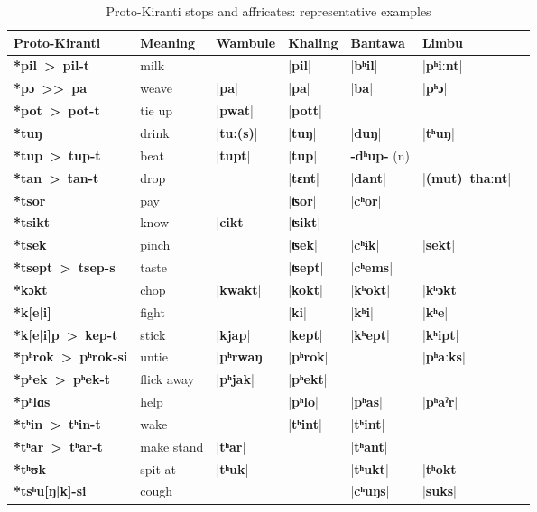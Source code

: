\documentclass[oldfontcommands,oneside,a4paper,11pt]{article}
\newcommand{\ipa}[1]{\textbf{{\phon\mbox{#1}}}} %
\newcommand{\dhat}[1]{|\ipa{#1}|}
\begin{document}
\begin{table}
\caption{Proto-Kiranti stops and affricates: representative examples} \centering \label{tab:stops.ex}
\begin{tabular}{lllllll}
\toprule
Proto-Kiranti & Meaning & Wambule & Khaling & Bantawa & Limbu\\
\midrule
\ipa{*pil > pil-t} &	milk &	&	\dhat{pil} &	\dhat{bʰil} &	\dhat{pʰiːnt} &	\\
\ipa{*pɔ >{}> pa} &	weave &	\dhat{pa} &	\dhat{pa} &	\dhat{ba} &	\dhat{pʰɔ} &	\\
\ipa{*pot > pot-t} &	tie up &	\dhat{pwat} &	\dhat{pott} &	&	&	\\
\midrule			
\ipa{*tuŋ} &	drink &	\dhat{tu:(s)} &	\dhat{tuŋ} &	\dhat{duŋ} &	\dhat{tʰuŋ} &	\\
\ipa{*tup > tup-t} &	beat &	\dhat{tupt} &	\dhat{tup} &	\ipa{-dʰup-} (n)&	&	\\
\ipa{*tan > tan-t} &	drop &	&	\dhat{tɛnt} &	\dhat{dant} &	\dhat{(mut) thaːnt} &	\\
\midrule				
\ipa{*tsor} &	pay &	&	\dhat{ʦor} &	\dhat{cʰor} &	&	\\
\ipa{*tsikt} &	know &	\dhat{cikt} &	\dhat{ʦikt} &	&	&	\\
\ipa{*tsek} &	pinch &	 &	\dhat{ʦek} &	\dhat{cʰɨk} &	\dhat{sekt} &	\\
\ipa{*tsept > tsep-s} &	taste &	&	\dhat{ʦept} &	\dhat{cʰems} &	&	\\
\midrule
\ipa{*kɔkt} &	chop &	\dhat{kwakt} &	\dhat{kokt} &	\dhat{kʰokt} &	\dhat{kʰɔkt} &	\\
\ipa{*k[e|i]} &	fight &	&	\dhat{ki} &	\dhat{kʰi} &	\dhat{kʰe} &	\\
\ipa{*k[e|i]p > kep-t } &	stick &	\dhat{kjap} &	\dhat{kept} &	\dhat{kʰept} &	\dhat{kʰipt} &	\\
\midrule				
\ipa{*pʰrok > pʰrok-si} &	untie &	\dhat{pʰrwaŋ} &	\dhat{pʰrok} &	&	\dhat{pʰaːks} &	\\
\ipa{*pʰek > pʰek-t} &	flick away &	\dhat{pʰjak} &	\dhat{pʰekt} &	&	 &	\\
\ipa{*pʰlɑs} &	help &	&	\dhat{pʰlo} &	\dhat{pʰas} &	\dhat{pʰaˀr} &	\\
\midrule				
\ipa{*tʰin > tʰin-t} &	wake &	&	\dhat{tʰint} &	\dhat{tʰint} &	&	\\
\ipa{*tʰar > tʰar-t} &	make stand &	\dhat{tʰar} &	&	\dhat{tʰant} &	&	\\
\ipa{*tʰʊk} &	spit at &	\dhat{tʰuk} &	&	\dhat{tʰukt} &	\dhat{tʰokt} &	\\
\midrule		
\ipa{*tsʰu[ŋ|k]-si} &	cough &	&	&	\dhat{cʰuŋs} &	\dhat{suks} &	\\

\end{tabular}
\end{table}
\end{document}
